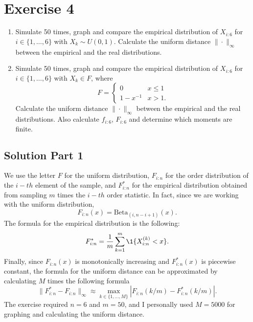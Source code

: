 \newpage
\section{Exercise 4}
\begin{enumerate}
    \item Simulate 50 times, graph and compare the empirical distribution of $X_{i:6}$ for $i \in \{1,\ldots, 6\}$ with $X_k \sim U(0,1)$. Calculate the uniform distance $\|\cdot\|_\infty$ between the empirical and the real distributions.
    \item Simulate 50 times, graph and compare the empirical distribution of $X_{i:6}$ for $i \in \{1,\ldots, 6\}$ with $X_k \in F$, where
    \[ F = \begin{cases}
        0 & x\leq 1\\
        1- x^{-1} & x > 1.
    \end{cases} \]
    Calculate the uniform distance $\|\cdot\|_\infty$ between the empirical and the real distributions. Also calculate $f_{i:6}$, $F_{i:6}$ and determine which moments are finite.
\end{enumerate}


\subsection*{Solution Part 1}

We use the letter $F$ for the uniform distribution, $F_{i:n}$ for the order distribution of the $i-th$ element of the sample, and $F^*_{i:n}$ for the empirical distribution obtained from sampling $m$ times the $i-th$ order statistic. In fact, since we are working with the uniform distribution,
\[ F_{i:n}(x) = \text{Beta}_{(i,n-i+1)}(x). \]
The formula for the empirical distribution is the following:
\[ F^*_{i:n} = \frac{1}{m} \sum_{k = 1}^m \1\{X_{i:n}^{(k)} < x\}. \]
Finally, since $F_{i:n}(x)$ is monotonically increasing and $F^{*}_{i:n}(x)$ is piecewise constant, the formula for the uniform distance can be approximated by calculating $M$ times the following formula 
\[ \|F^*_{i:n} - F_{i:n}\|_\infty \approx \max_{k \in \{1,\ldots, M\}} |F_{i:n}(k/m) - F^*_{i:n}(k/m)|.\]
The exercise required $n = 6$ and $m = 50$, and I personally used $M = 5000$ for graphing and calculating the uniform distance.

\newpage

